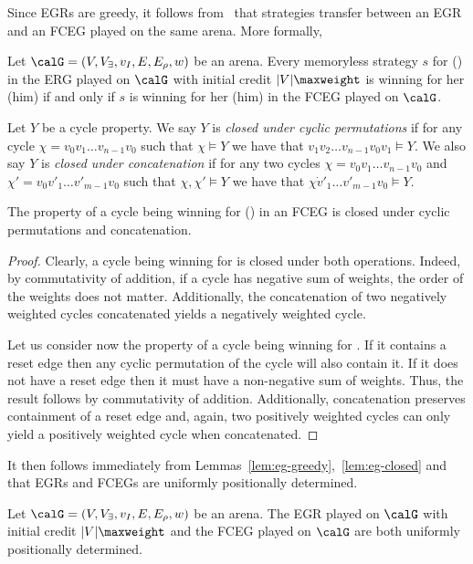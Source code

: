 \documentclass[a4paper]{article}
\begin{document}
Since EGRs are greedy, it follows from~\cite{ar14} that strategies transfer
between an EGR and an FCEG played on the same arena. More formally,
\begin{proposition}\label{pro:strat-transfer}
	Let $\calG = (V,V_\exists,v_I,E,E_\rho,w)$ be an arena.
	Every memoryless strategy $s$ for \eve (\adam) in the ERG played
	on $\calG$ with initial credit $|V|\maxweight$ is winning for her (him)
	if and only if $s$ is winning for her (him) in the FCEG played on
	$\calG$.
\end{proposition}

 Let $Y$ be a cycle property. We say $Y$ is
\emph{closed under cyclic permutations} if for any cycle $\chi = v_0 v_1 \dots
v_{n-1}v_0$ such that $\chi \models Y$ we have that $v_1 v_2
\dots v_{n-1} v_0 v_1  \models Y$.
We also say $Y$ is \emph{closed under concatenation} if for any
two cycles $\chi = v_0 v_1 \dots v_{n-1} v_0$ and $\chi' = v_0 v'_1 \dots
v'_{m-1} v_0$ such that $\chi,\chi' \models Y$ we have that $\chi \dot v'_1 \dots
v'_{m-1} v_0 \models Y$.
%
\begin{lemma}\label{lem:eg-closed}
	The property of a cycle being winning for \eve (\adam) in an FCEG is
	closed under cyclic permutations and concatenation.
\end{lemma}
\begin{proof}
	Clearly, a cycle being winning for \adam is closed under both
	operations. Indeed, by commutativity of addition, if a cycle has
	negative sum of weights, the order of the weights does not matter.
	Additionally, the concatenation of two negatively weighted
	cycles concatenated yields a
	negatively weighted cycle.

	Let us consider now the property of a cycle being winning for \eve. If
	it contains a reset edge then any cyclic permutation of the cycle will
	also contain it. If it does not have a reset edge then it must have a
	non-negative sum of weights. Thus, the result follows by commutativity
	of addition. Additionally, concatenation preserves containment of
	a reset edge and, again, two positively weighted cycles can only yield a
	positively weighted cycle when concatenated.
\end{proof}
It then follows immediately from Lemmas~\ref{lem:eg-greedy},~\ref{lem:eg-closed}
and~\cite{ar14} that EGRs and FCEGs are uniformly positionally determined.
\begin{proposition}\label{pro:eg-pos-det}
	Let $\calG = (V,V_\exists,v_I,E,E_\rho,w)$ be an arena.
	The EGR played on $\calG$ with initial credit $|V|\maxweight$ and
	the FCEG played on $\calG$ are both uniformly positionally determined.
\end{proposition}
\end{document}
